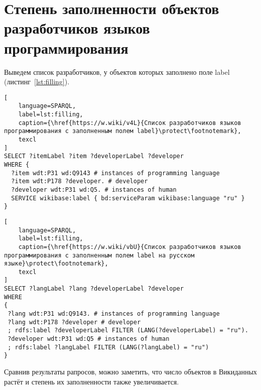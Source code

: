 \section{Степень заполненности объектов разработчиков языков программирования}
Выведем список разработчиков, у объектов которых заполнено поле label (листинг~\ref{lst:filling}).

\begin{lstlisting}[
	language=SPARQL,
	label=lst:filling,
	caption={\href{https://w.wiki/v4L}{Список разработчиков языков программирования с заполненным полем label}\protect\footnotemark},
	texcl
]
SELECT ?itemLabel ?item ?developerLabel ?developer
WHERE {
  ?item wdt:P31 wd:Q9143 # instances of programming language
  ?item wdt:P178 ?developer. # developer 
  ?developer wdt:P31 wd:Q5. # instances of human
  SERVICE wikibase:label { bd:serviceParam wikibase:language "ru" }
}
\end{lstlisting}

\begin{lstlisting}[
	language=SPARQL,
	label=lst:filling,
	caption={\href{https://w.wiki/vbU}{Список разработчиков языков программирования с заполненным полем label на русском языке}\protect\footnotemark},
	texcl
]
SELECT ?langLabel ?lang ?developerLabel ?developer
WHERE
{
 ?lang wdt:P31 wd:Q9143. # instances of programming language
 ?lang wdt:P178 ?developer # developer 
 ; rdfs:label ?developerLabel FILTER (LANG(?developerLabel) = "ru").
 ?developer wdt:P31 wd:Q5 # instances of human
 ; rdfs:label ?langLabel FILTER (LANG(?langLabel) = "ru")
}
\end{lstlisting}

Сравнив результаты рапросов, можно заметить, что число объектов в Викиданных растёт и степень их заполненности также увеличивается.

